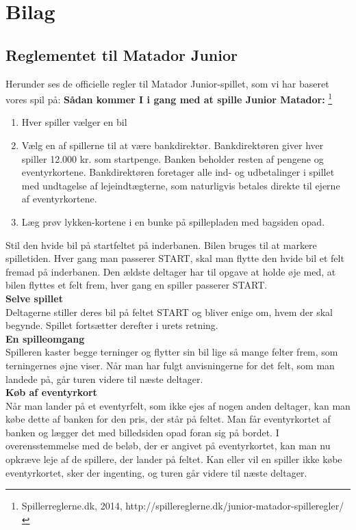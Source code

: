 \chapter{Bilag}

\section{Reglementet til Matador Junior}
Herunder ses de officielle regler til Matador Junior-spillet, som vi har baseret vores spil på:
\textbf{Sådan kommer I i gang med at spille Junior Matador:} \footnote{Spillerreglerne.dk, 2014, http://spillereglerne.dk/junior-matador-spilleregler/}
\\
\begin{enumerate}
    \item Hver spiller vælger en bil
    \item Vælg en af spillerne til at være bankdirektør. 
    Bankdirektøren giver hver spiller 12.000 kr. som startpenge. 
    Banken beholder resten af pengene og eventyrkortene. 
    Bankdirektøren foretager alle ind- og udbetalinger i spillet med undtagelse af lejeindtægterne, som naturligvis betales direkte til ejerne af eventyrkortene.
    \item Læg prøv lykken-kortene i en bunke på spillepladen med bagsiden opad.\\
\end{enumerate}
Stil den hvide bil på startfeltet på inderbanen. 
Bilen bruges til at markere spilletiden.
Hver gang man passerer START, skal man flytte den hvide bil et felt fremad på inderbanen. 
Den ældste deltager har til opgave at holde øje med, at bilen flyttes et felt frem, hver gang en spiller passerer START.\\

\textbf{Selve spillet}
\\Deltagerne stiller deres bil på feltet START og bliver enige om, hvem der skal begynde. 
Spillet fortsætter derefter i urets retning.\\

\textbf{En spilleomgang}
\\Spilleren kaster begge terninger og flytter sin bil lige så mange felter frem, som terningernes øjne viser. 
Når man har fulgt anvisningerne for det felt, som man landede på, går turen videre til næste deltager.\\

\textbf{Køb af eventyrkort}
\\Når man lander på et eventyrfelt, som ikke ejes af nogen anden deltager, kan man købe dette af banken for den pris, der står på feltet. 
Man får eventyrkortet af banken og lægger det med billedsiden opad foran sig på bordet. 
I overensstemmelse med de beløb, der er angivet på eventyrkortet, kan man nu opkræve leje af de spillere, der lander på feltet. 
Kan eller vil en spiller ikke købe eventyrkortet, sker der ingenting, og turen går videre til næste deltager.\\

